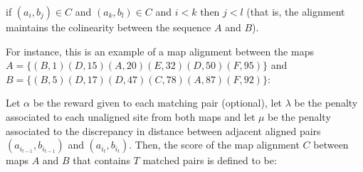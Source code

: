 {\begin{menumerate}
\item if $(a_i,b_j) \in C$ and $(a_k,b_l) \in C$ and $i<k$ then
$j<l$ (that is, the alignment maintains the colinearity between the
sequence $A$ and $B$).
 \end{menumerate}

For instance, this is an example of a map alignment between the maps $A=\{(B,1)(D,15)(A,20)(E,32)(D,50)(F,95)\}$ and $B=\{(B,5)(D,17)(D,47)(C,78)(A,87)(F,92)\}$:
\begin{center}
\end{center}

Let $\alpha$ be the reward given to each matching pair (optional), let $\lambda$ be the penalty associated to each
unaligned site from both maps and let $\mu$ be the penalty associated to the discrepancy in distance between
adjacent aligned pairs $(a_{i_{t-1}},b_{i_{t-1}})$ and $(a_{i_t},b_{i_t})$. Then, the score of the map
alignment $C$ between maps $A$ and $B$ that contains $T$ matched pairs is defined to be:

\begin{center}
\end{center}

}
